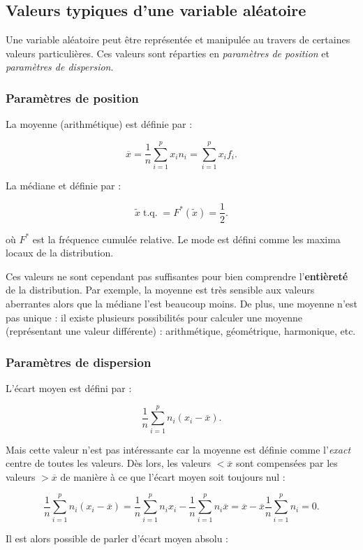 \documentclass{article}
\DeclareMathOperator{\tq}{\text{ t.q. }}
\begin{document}
	\subsection{Valeurs typiques d'une variable aléatoire}
		Une variable aléatoire peut être représentée et manipulée au travers de certaines valeurs particulières. Ces valeurs sont réparties en \textit{paramètres de position}
		et \textit{paramètres de dispersion}.

		\subsubsection{Paramètres de position}
			La moyenne (arithmétique) est définie par :
			
			\[\overline{x} = \frac 1n\sum_{i=1}^px_in_i = \sum_{i=1}^px_if_i.\]

			La médiane et définie par :

			\[\widetilde{x} \tq = F^*(\widetilde{x}) = \frac 12.\]

			où $F^*$ est la fréquence cumulée relative. Le mode est défini comme les maxima locaux de la distribution.

			Ces valeurs ne sont cependant pas suffisantes pour bien comprendre l'\textbf{entièreté} de la distribution. Par exemple, la moyenne est très sensible aux valeurs
			aberrantes alors que la médiane l'est beaucoup moins. De plus, une moyenne n'est pas unique : il existe plusieurs possibilités pour calculer une moyenne
			(représentant une valeur différente) : arithmétique, géométrique, harmonique, etc.

		\subsubsection{Paramètres de dispersion}
			L'écart moyen est défini par :

			\[\frac 1n\sum_{i=1}^pn_i(x_i-\overline{x}).\]

			Mais cette valeur n'est pas intéressante car la moyenne est définie comme l'\textit{exact} centre de toutes les valeurs. Dès lors, les valeurs $< \overline x$
			sont compensées par les valeurs $> \overline x$ de manière à ce que l'écart moyen soit toujours nul :

			\[\frac 1n\sum_{i=1}^pn_i(x_i-\overline x) = \frac 1n\sum_{i=1}^pn_ix_i - \frac 1n\sum_{i=1}^pn_i\overline x =\overline x - \overline{x}\frac 1n\sum_{i=1}^pn_i = 0.\]

			Il est alors possible de parler d'écart moyen absolu :
\end{document}
